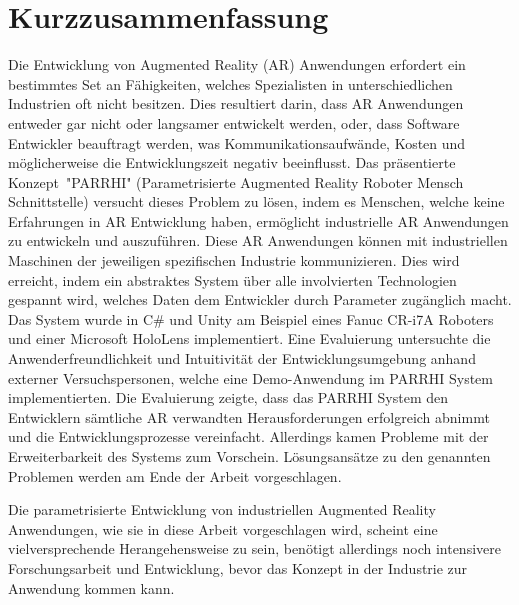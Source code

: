 \chapter*{Kurzzusammenfassung}
\label{Chap:Abstract_German}
Die Entwicklung von Augmented Reality (AR) Anwendungen erfordert ein bestimmtes Set an Fähigkeiten, welches Spezialisten in unterschiedlichen Industrien oft nicht besitzen. Dies resultiert darin, dass AR Anwendungen entweder gar nicht oder langsamer entwickelt werden, oder, dass Software Entwickler beauftragt werden, was Kommunikationsaufwände, Kosten und möglicherweise die Entwicklungszeit negativ beeinflusst. Das präsentierte Konzept~"PARRHI" (Parametrisierte Augmented Reality Roboter Mensch Schnittstelle) versucht dieses Problem zu lösen, indem es Menschen, welche keine Erfahrungen in AR Entwicklung haben, ermöglicht industrielle AR Anwendungen zu entwickeln und auszuführen. Diese AR Anwendungen können mit industriellen Maschinen der jeweiligen spezifischen Industrie kommunizieren. Dies wird erreicht, indem ein abstraktes System über alle involvierten Technologien gespannt wird, welches Daten dem Entwickler durch Parameter zugänglich macht. Das System wurde in C\# und Unity am Beispiel eines Fanuc CR-i7A Roboters und einer Microsoft HoloLens implementiert. Eine Evaluierung untersuchte die Anwenderfreundlichkeit und Intuitivität der Entwicklungsumgebung anhand externer Versuchspersonen, welche eine Demo-Anwendung im PARRHI System implementierten. Die Evaluierung zeigte, dass das PARRHI System den Entwicklern sämtliche AR verwandten Herausforderungen erfolgreich abnimmt und die Entwicklungsprozesse vereinfacht. Allerdings kamen Probleme mit der Erweiterbarkeit des Systems zum Vorschein. Lösungsansätze zu den genannten Problemen werden am Ende der Arbeit vorgeschlagen.

Die parametrisierte Entwicklung von industriellen Augmented Reality Anwendungen, wie sie in diese Arbeit vorgeschlagen wird, scheint eine vielversprechende Herangehensweise zu sein, benötigt allerdings noch intensivere Forschungsarbeit und Entwicklung, bevor das Konzept in der Industrie zur Anwendung kommen kann.